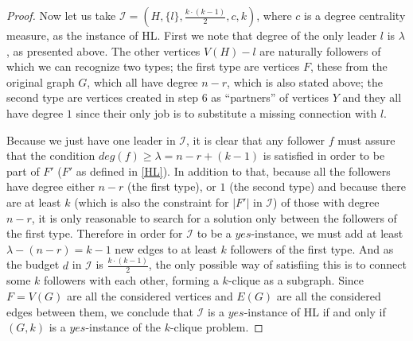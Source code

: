 \begin{proof}
    Now let us take $ \mathcal{I} = (H, \{l\}, \frac{k\cdot(k-1)}{2}, c, k)$, where $c$ is a degree centrality measure,
    as the instance of HL.
    First we note that degree of the only leader $l$ is $\lambda$, as presented above.
    The other vertices $V(H) - l$ are naturally followers of which we can recognize two types;
    the first type are vertices $F$, these from the original graph $G$, which all have degree $n-r$,
    which is also stated above;
    the second type are vertices created in step 6 as ``partners'' of vertices $Y$ and they all have degree $1$
    since their only job is to substitute a missing connection with $l$.

    Because we just have one leader in $\mathcal{I}$, it is clear that any follower $f$ must assure that the condition
    $deg(f) \geq \lambda = n - r + (k - 1)$ is satisfied in order to be part of $F'$ ($F'$ as defined in \ref{HL}).
    In addition to that, because all the followers have degree either $n-r$ (the first type), or $1$ (the second type) and because
    there are at least $k$ (which is also the constraint for $|F'|$ in $\mathcal{I}$) of those with degree $n-r$,
    it is only reasonable to search for a solution only between the followers of the first type.
    Therefore in order for $\mathcal{I}$ to be a $yes$-instance,
    we must add at least $\lambda - (n - r) = k - 1$ new edges to at least $k$ followers of the first type.
    And as the budget $d$ in $\mathcal{I}$ is $\frac{k\cdot(k-1)}{2}$, the only possible way of satisfiing this is to connect
    some $k$ followers with each other, forming a $k$-clique as a subgraph.
    Since $F = V(G)$ are all the considered vertices and $E(G)$ are all the considered edges between them,
    we conclude that $\mathcal{I}$ is a $yes$-instance of HL if and only if $(G, k)$ is a $yes$-instance of the $k$-clique problem.
\end{proof}
